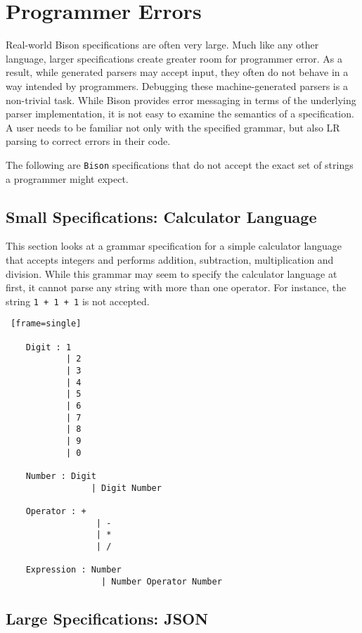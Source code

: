 \section{Programmer Errors}

Real-world Bison specifications are often very large. Much like any other language, larger specifications create greater room for programmer error. As a result, while generated parsers may accept input, they often do not behave in a way intended by programmers. Debugging these machine-generated parsers is a non-trivial task. While Bison provides error messaging in terms of the underlying parser implementation, it is not easy to examine the semantics of a specification. A user needs to be familiar not only with the specified grammar, but also LR parsing to correct errors in their code.

The following are \verb|Bison| specifications that do not accept the exact set of strings a programmer might expect.

\subsection{Small Specifications: Calculator Language}

This section looks at a grammar specification for a simple calculator language \cite{DonnellyandStallman} that accepts integers and performs addition, subtraction, multiplication and division. While this grammar may seem to specify the calculator language at first, it cannot parse any string with more than one operator. For instance, the string \verb|1 + 1 + 1| is not accepted.

\begin{Verbatim} [frame=single]

	Digit : 1 
            | 2
            | 3
            | 4
            | 5
            | 6
            | 7
            | 8
            | 9
            | 0

	Number : Digit 
                 | Digit Number
	
	Operator : + 
                  | -
                  | *
                  | /
	
	Expression : Number
                   | Number Operator Number

\end{Verbatim}

\subsection{Large Specifications: JSON}

